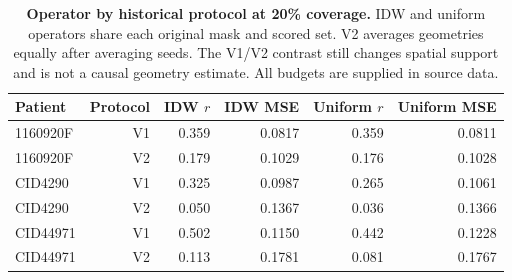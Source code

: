 \begin{table}[!htbp]
\caption{\textbf{Operator by historical protocol at 20\% coverage.} IDW and uniform operators share each original mask and scored set. V2 averages geometries equally after averaging seeds. The V1/V2 contrast still changes spatial support and is not a causal geometry estimate. All budgets are supplied in source data.}
\label{tab:journal_factorial}
\centering\footnotesize
\begin{tabular}{@{}lrrrrr@{}}
\toprule
Patient & Protocol & IDW $r$ & IDW MSE & Uniform $r$ & Uniform MSE \\
\midrule
1160920F & V1 & 0.359 & 0.0817 & 0.359 & 0.0811 \\
1160920F & V2 & 0.179 & 0.1029 & 0.176 & 0.1028 \\
CID4290 & V1 & 0.325 & 0.0987 & 0.265 & 0.1061 \\
CID4290 & V2 & 0.050 & 0.1367 & 0.036 & 0.1366 \\
CID44971 & V1 & 0.502 & 0.1150 & 0.442 & 0.1228 \\
CID44971 & V2 & 0.113 & 0.1781 & 0.081 & 0.1767 \\
\bottomrule
\end{tabular}
\end{table}
\FloatBarrier
